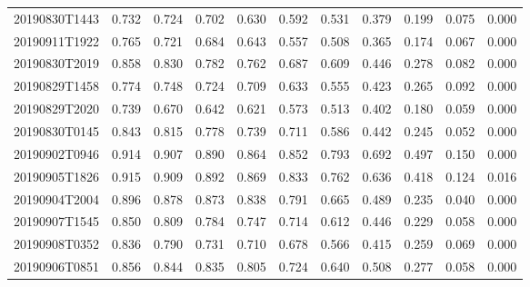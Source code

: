 \begin{table}[!ht]
{\begin{tabular}{ccccccccccc}
			20190830T1443 &          0.732 &          0.724 &          0.702 &          0.630 &          0.592 &          0.531 &          0.379 &          0.199 &          0.075 &          0.000 \\
			20190911T1922 &          0.765 &          0.721 &          0.684 &          0.643 &          0.557 &          0.508 &          0.365 &          0.174 &          0.067 &          0.000 \\
			20190830T2019 &          0.858 &          0.830 &          0.782 &          0.762 &          0.687 &          0.609 &          0.446 &          0.278 &          0.082 &          0.000 \\
			20190829T1458 &          0.774 &          0.748 &          0.724 &          0.709 &          0.633 &          0.555 &          0.423 &          0.265 &          0.092 &          0.000 \\
			20190829T2020 &          0.739 &          0.670 &          0.642 &          0.621 &          0.573 &          0.513 &          0.402 &          0.180 &          0.059 &          0.000 \\
			20190830T0145 &          0.843 &          0.815 &          0.778 &          0.739 &          0.711 &          0.586 &          0.442 &          0.245 &          0.052 &          0.000 \\
			20190902T0946 &          0.914 &          0.907 &          0.890 &          0.864 &          0.852 &          0.793 &          0.692 &          0.497 &          0.150 &          0.000 \\
			20190905T1826 &          0.915 &          0.909 &          0.892 &          0.869 &          0.833 &          0.762 &          0.636 &          0.418 &          0.124 &          0.016 \\
			20190904T2004 &          0.896 &          0.878 &          0.873 &          0.838 &          0.791 &          0.665 &          0.489 &          0.235 &          0.040 &          0.000 \\
			20190907T1545 &          0.850 &          0.809 &          0.784 &          0.747 &          0.714 &          0.612 &          0.446 &          0.229 &          0.058 &          0.000 \\
			20190908T0352 &          0.836 &          0.790 &          0.731 &          0.710 &          0.678 &          0.566 &          0.415 &          0.259 &          0.069 &          0.000 \\
			20190906T0851 &          0.856 &          0.844 &          0.835 &          0.805 &          0.724 &          0.640 &          0.508 &          0.277 &          0.058 &          0.000 \\

\end{tabular}}
\end{table}

